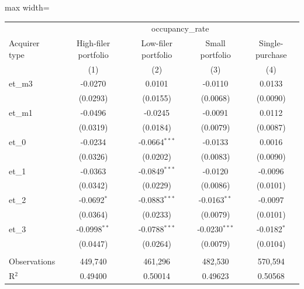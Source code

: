 \documentclass[
  11pt,
]{article}
\begin{document}
\scriptsize
\begin{adjustbox}{max width=\textwidth}

\begingroup
\centering
\begin{tabular}{lcccc}
   \toprule
    & \multicolumn{4}{c}{occupancy\_rate}\\
   Acquirer type      & High-filer portfolio & Low-filer portfolio & Small portfolio       & Single-purchase \\   
                      & (1)                  & (2)                 & (3)                   & (4)\\  
   \midrule 
   et\_m3             & -0.0270              & 0.0101              & -0.0110               & 0.0133\\   
                      & (0.0293)             & (0.0155)            & (0.0068)              & (0.0090)\\   
   et\_m1             & -0.0496              & -0.0245             & -0.0091               & 0.0112\\   
                      & (0.0319)             & (0.0184)            & (0.0079)              & (0.0087)\\   
   et\_0              & -0.0234              & -0.0664$^{***}$     & -0.0133               & 0.0016\\   
                      & (0.0326)             & (0.0202)            & (0.0083)              & (0.0090)\\   
   et\_1              & -0.0363              & -0.0849$^{***}$     & -0.0120               & -0.0096\\   
                      & (0.0342)             & (0.0229)            & (0.0086)              & (0.0101)\\   
   et\_2              & -0.0692$^{*}$        & -0.0883$^{***}$     & -0.0163$^{**}$        & -0.0097\\   
                      & (0.0364)             & (0.0233)            & (0.0079)              & (0.0101)\\   
   et\_3              & -0.0998$^{**}$       & -0.0788$^{***}$     & -0.0230$^{***}$       & -0.0182$^{*}$\\   
                      & (0.0447)             & (0.0264)            & (0.0079)              & (0.0104)\\   
    \\
   Observations       & 449,740              & 461,296             & 482,530               & 570,594\\  
   R$^2$              & 0.49400              & 0.50014             & 0.49623               & 0.50568\\  

\end{tabular}
\end{adjustbox}
\end{document}
